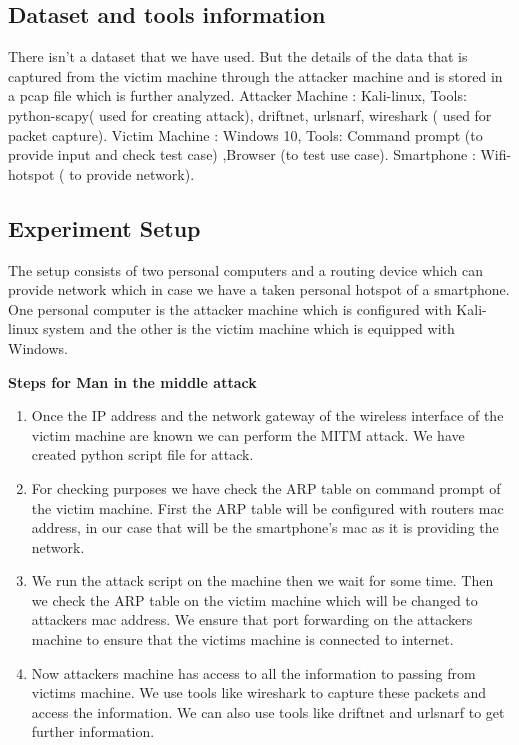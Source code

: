 \documentclass[11pt]{article}
\begin{document}
\subsection{Dataset and tools information}
There isn’t  a dataset that we have used. But the details of the data that is captured from the victim machine through the attacker machine and is stored in a pcap file which is further analyzed.
Attacker Machine : Kali-linux,
Tools:  python-scapy( used for creating attack), driftnet, urlsnarf, wireshark ( used for packet capture).
Victim Machine : Windows 10,
Tools: Command prompt (to provide input and check test case) ,Browser (to test use case).
Smartphone  : Wifi-hotspot ( to provide network).
\subsection{Experiment Setup}

The setup consists of two personal computers and a routing device which can provide network which in case we have a taken personal hotspot of a smartphone. One personal computer is the attacker machine which is configured with Kali-linux system and the other is the victim machine which is equipped with Windows.

\textbf{Steps for Man in the middle attack}

\begin{enumerate}
 \item Once the IP address and the network gateway of the wireless interface of the victim machine are known we can perform the MITM attack.  We have created python script file for attack. 
 \item For checking purposes we have check the ARP table on command prompt of the victim machine. First the ARP table will be configured with routers mac address, in our case that will be the smartphone’s mac as it is providing the network. 
 \item We run the attack script on the machine then we wait for some time. Then we check the ARP table on the victim machine which will be changed to attackers mac address. We ensure that port forwarding on the attackers machine to ensure that the victims machine is connected to internet. 
 \item Now attackers machine has access to all the information to passing from victims machine. We use tools like wireshark to capture these packets and access the information. We can also use tools like driftnet and urlsnarf to get further information.  

\end{enumerate}
\end{document}
